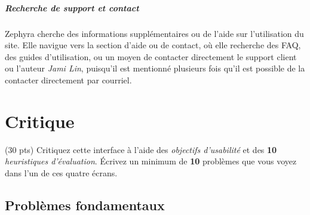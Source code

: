 \documentclass[9pt]{report}
\begin{document}
\begin{multicols*}{2}
  \paragraph{Recherche de support et contact}
  Zephyra cherche des informations supplémentaires ou de l'aide sur 
  l'utilisation du site. Elle navigue vers la section d'aide ou de 
  contact, où elle recherche des FAQ, des guides d'utilisation, ou 
  un moyen de contacter directement le support client ou l'auteur \textit{Jami Lin}, 
  puisqu'il est mentionné plusieurs fois qu'il est possible de la 
  contacter directement par courriel. 

  \chapter{Critique}
  \begin{Exercice}{(30 pts)}{}
    Critiquez cette interface à l’aide des \textit{objectifs d’usabilité} et des 
  \textbf{10} \textit{heuristiques d’évaluation}. Écrivez un minimum 
  de \textbf{10} problèmes que vous voyez dans l’un de ces quatre écrans.     
  \end{Exercice}

  \section{Problèmes fondamentaux}


\end{multicols*}
\end{document}
